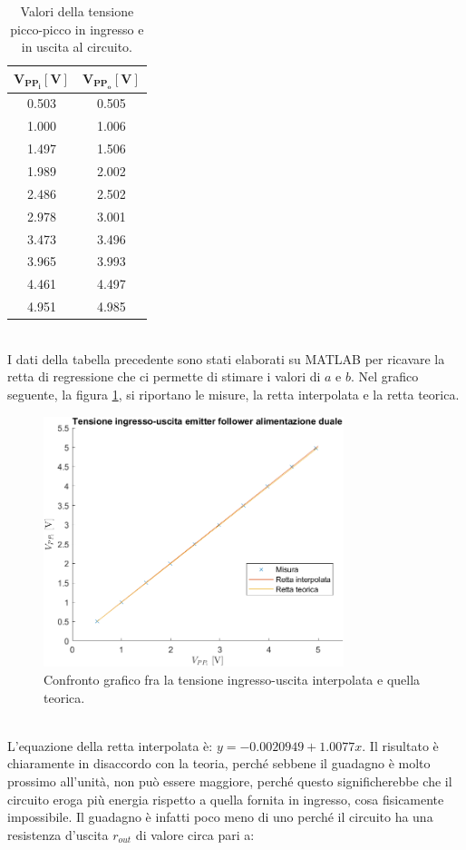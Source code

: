 \documentclass{report}
\begin{document}
\begin{table}[h]
	\centering
	\begin{tabular}{|c|c|}
		\hline
		$\mathbf{V_{PP_i}[V]}$ & $\mathbf{V_{PP_o}[V]}$\\ 
		\hline
		0.503 & 0.505 \\
		\hline
		1.000 & 1.006 \\
		\hline
		1.497 & 1.506 \\
		\hline
		1.989 & 2.002 \\
		\hline
		2.486 & 2.502 \\
		\hline
		2.978 & 3.001 \\
		\hline
		3.473 & 3.496 \\
		\hline
		3.965 & 3.993 \\
		\hline
		4.461 & 4.497 \\
		\hline
		4.951 & 4.985 \\
		\hline
	\end{tabular}
\caption{Valori della tensione picco-picco in ingresso e in uscita al circuito.}
\label{table:tabgrafico}
\end{table}
\\I dati della tabella precedente sono stati elaborati su MATLAB per ricavare la retta di regressione che ci permette di stimare i valori di $a$ e $b$. Nel grafico seguente, la figura \ref{figura:graficoEFv1}, si riportano le misure, la retta interpolata e la retta teorica. 
\begin{figure}[h]
\centering
\includegraphics[height=7.3cm]{immagini/graficoEFv1}
\caption{Confronto grafico fra la tensione ingresso-uscita interpolata e quella teorica.}
\label{figura:graficoEFv1}
\end{figure}
\\L'equazione della retta interpolata è: $y=-0.0020949+1.0077x$. Il risultato è chiaramente in disaccordo con la teoria, perché sebbene il guadagno è molto prossimo all'unità, non può essere maggiore, perché questo significherebbe che il circuito eroga più energia rispetto a quella fornita in ingresso, cosa fisicamente impossibile. Il guadagno è infatti poco meno di uno perché il circuito ha una resistenza d'uscita $r_{out}$ di valore circa pari a:
\end{document}
